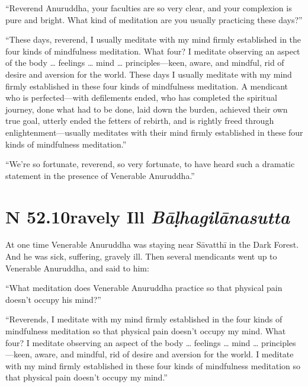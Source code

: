 \documentclass[12pt,openany]{book}%
\newcommand*{\suttatitleacronym}[1]{\smaller[2]{#1}\vspace*{.3em}}
\newcommand*{\suttatitletranslation}[1]{\linebreak{#1}}
\newcommand*{\suttatitleroot}[1]{\linebreak\smaller[2]\itshape{#1}}
\newcommand*{\tocacronym}[1]{\hspace*{-3.3em}{#1}\quad}
\newcommand*{\toctranslation}[1]{#1}
\newcommand*{\tocroot}[1]{(\textit{#1})}
\begin{document}
“Reverend Anuruddha, your faculties are so very clear, and your complexion is pure and bright. What kind of meditation are you usually practicing these days?” 

“These days, reverend, I usually meditate with my mind firmly established in the four kinds of mindfulness meditation. What four? I meditate observing an aspect of the body … feelings … mind … principles—keen, aware, and mindful, rid of desire and aversion for the world. These days I usually meditate with my mind firmly established in these four kinds of mindfulness meditation. A mendicant who is perfected—with defilements ended, who has completed the spiritual journey, done what had to be done, laid down the burden, achieved their own true goal, utterly ended the fetters of rebirth, and is rightly freed through enlightenment—usually meditates with their mind firmly established in these four kinds of mindfulness meditation.” 

“We’re so fortunate, reverend, so very fortunate, to have heard such a dramatic statement in the presence of Venerable Anuruddha.” 

%
\section*{{\suttatitleacronym SN 52.10}{\suttatitletranslation Gravely Ill }{\suttatitleroot Bāḷhagilānasutta}}
\addcontentsline{toc}{section}{\tocacronym{SN 52.10} \toctranslation{Gravely Ill } \tocroot{Bāḷhagilānasutta}}

At one time Venerable Anuruddha was staying near \textsanskrit{Sāvatthī} in the Dark Forest. And he was sick, suffering, gravely ill. Then several mendicants went up to Venerable Anuruddha, and said to him: 

“What meditation does Venerable Anuruddha practice so that physical pain doesn’t occupy his mind?” 

“Reverends, I meditate with my mind firmly established in the four kinds of mindfulness meditation so that physical pain doesn’t occupy my mind. What four? I meditate observing an aspect of the body … feelings … mind … principles—keen, aware, and mindful, rid of desire and aversion for the world. I meditate with my mind firmly established in these four kinds of mindfulness meditation so that physical pain doesn’t occupy my mind.” 
\end{document}
